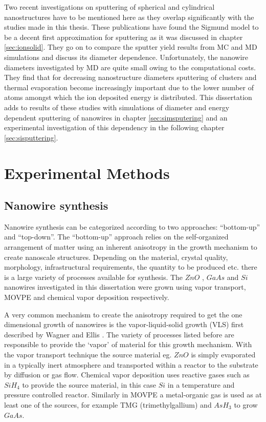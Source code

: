 Two recent investigations on sputtering of spherical \cite{nietiadi_sputtering_2014} and cylindrical \cite{urbassek_sputter_2015} nanostructures have to be mentioned here as they overlap significantly with the studies made in this thesis. These publications have found the Sigmund model to be a decent first approximation for sputtering as it was discussed in chapter \ref{sec:ionsolid}. They go on to compare the sputter yield results from MC and MD simulations and discuss its diameter dependence. Unfortunately, the nanowire diameters investigated by MD are quite small owing to the computational costs. They find that for decreasing nanostructure diameters sputtering of clusters and thermal evaporation become increasingly important due to the lower number of atoms amongst which the ion deposited energy is distributed. This dissertation adds to results of these studies with simulations of diameter and energy dependent sputtering of nanowires in chapter \ref{sec:simsputering} and an experimental investigation of this dependency in the following chapter \ref{sec:sisputtering}.


\chapter{Experimental Methods}

\section{Nanowire synthesis}

Nanowire synthesis can be categorized according to two approaches: ``bottom-up'' and ``top-down''. The ``bottom-up'' approach relies on the self-organized arrangement of matter using an inherent anisotropy in the growth mechanism to create nanoscale structures. Depending on the material, crystal quality, morphology, infrastructural requirements, the quantity to be produced etc. there is a large variety of processes available for synthesis. The $ZnO$ \cite{borchers_catalyst_2006, stichtenoth_dimensionseffekte_2008, muller_structural_2009,ogrisek_kontrolliertes_2013}, $GaAs$ \cite{borgstrom_size-_2004, wacaser_preferential_2009} and $Si$ \cite{lugstein_pressure-induced_2008} nanowires investigated in this dissertation were grown using vapor transport, MOVPE and chemical vapor deposition respectively. 

A very common mechanism to create the anisotropy required to get the one dimensional growth of nanowires is the vapor-liquid-solid growth (VLS) first described by Wagner and Ellis \cite{wagner_vapor-liquid-solid_1964}. The variety of processes listed before are responsible to provide the `vapor' of material for this growth mechanism. With the vapor transport technique the source material eg. $ZnO$ is simply evaporated in a typically inert atmosphere and transported within a reactor to the substrate by diffusion or gas flow. Chemical vapor deposition uses reactive gases such as $SiH_4$ to provide the source material, in this case $Si$ in a temperature and pressure controlled reactor. Similarly in MOVPE a metal-organic gas is used as at least one of the sources, for example TMG (trimethylgallium) and $AsH_3$ to grow $GaAs$.

